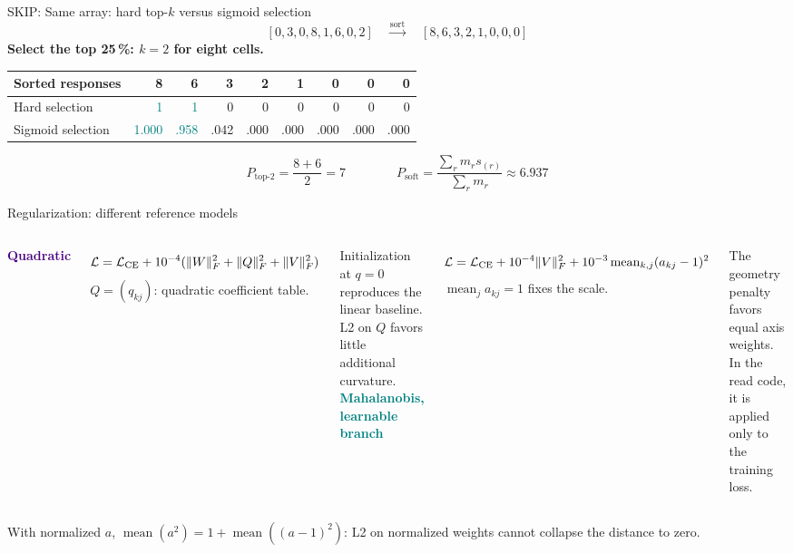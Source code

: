 \begin{frame}{SKIP: Same array: hard top-$k$ versus sigmoid selection}
\[ [0,3,0,8,1,6,0,2]\quad\xrightarrow{\text{sort}}\quad [8,6,3,2,1,0,0,0]\]
\textbf{Select the top 25\,\%: $k=2$ for eight cells.}
\begin{center}\renewcommand{\arraystretch}{1.4}
\begin{tabular}{@{}lrrrrrrrr@{}}\toprule
Sorted responses & 8 & 6 & 3 & 2 & 1 & 0 & 0 & 0\\\midrule
Hard selection & \textcolor{Teal}{1} & \textcolor{Teal}{1} & 0 & 0 & 0 & 0 & 0 & 0\\
Sigmoid selection & \textcolor{Teal}{1.000} & \textcolor{Teal}{.958} & \textcolor{Amber}{.042} & .000 & .000 & .000 & .000 & .000\\\bottomrule
\end{tabular}\end{center}
\[P_{\mathrm{top}\text{-}2}=\frac{8+6}{2}=7
\qquad\qquad P_{\mathrm{soft}}=\frac{\sum_r m_rs_{(r)}}{\sum_r m_r}\approx6.937\]
\end{frame}


\begin{frame}{Regularization: different reference models}

\begin{columns}[T,onlytextwidth]
\textcolor{Indigo}{\textbf{Quadratic}}\par
\[\mathcal L=\mathcal L_{\rm CE}+10^{-4}(\|W\|_F^2+\|Q\|_F^2+\|V\|_F^2)\]
\small $Q=(q_{kj})$: quadratic coefficient table.\par
\vspace{2mm}
Initialization at $q=0$ reproduces the linear baseline. L2 on $Q$ favors little additional curvature.
\textcolor{Teal}{\textbf{Mahalanobis, learnable branch}}\par
\[\mathcal L=\mathcal L_{\rm CE}+10^{-4}\|V\|_F^2
+10^{-3}\operatorname{mean}_{k,j}(a_{kj}-1)^2\]
\small $\operatorname{mean}_j a_{kj}=1$ fixes the scale.\par
\vspace{2mm}
The geometry penalty favors equal axis weights. In the read code, it is applied only to the training loss.
\end{columns}
\vspace{3mm}
\small With normalized $a$, $\operatorname{mean}(a^2)=1+\operatorname{mean}((a-1)^2)$: L2 on normalized weights cannot collapse the distance to zero.

\end{frame}

